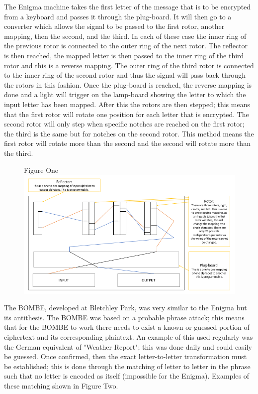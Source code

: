 \documentclass[12pt,a4paper]{article}
\begin{document}
The Enigma machine takes the first letter of the message that is to be encrypted from a keyboard and passes it through the plug-board. It will then go to a converter which allows the signal to be passed to the first rotor, another mapping, then the second, and the third. In each of these case the inner ring of the previous rotor is connected to the outer ring of the next rotor. The reflector is then reached, the mapped letter is then passed to the inner ring of the third rotor and this is a reverse mapping. The outer ring of the third rotor is connected to the inner ring of the second rotor and thus the signal will pass back through the rotors in this fashion. Once the plug-board is reached, the reverse mapping is done and a light will trigger on the lamp-board showing the letter to which the input letter has been mapped. After this the rotors are then stepped; this means that the first rotor will rotate one position for each letter that is encrypted. The second rotor will only step when specific notches are reached on the first rotor; the third is the same but for notches on the second rotor. This method means the first rotor will rotate more than the second and the second will rotate more than the third.\\

\begin{figure}[h]
\centering
Figure One
\includegraphics[width=\textwidth]{enigmaDiagram.png}
\end{figure}

The BOMBE, developed at Bletchley Park, was very similar to the Enigma but its antithesis. The BOMBE was based on a probable phrase attack; this means that for the BOMBE to work there needs to exist a known or guessed portion of ciphertext and its corresponding plaintext. An example of this  used regularly was the German equivalent of "Weather Report"; this was done daily and could easily be guessed. Once confirmed, then the exact letter-to-letter transformation must be established; this is done through the matching of letter to letter in the phrase such that no letter is encoded as itself (impossible for the Enigma). Examples of these matching shown in Figure Two.
\end{document}
